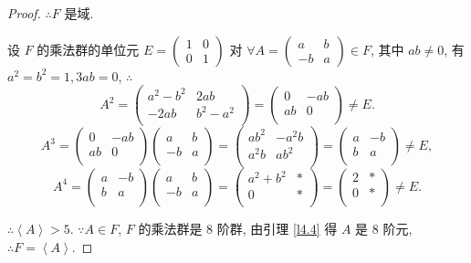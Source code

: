 \documentclass[color=black,device=normal,lang=cn,mode=geye]{elegantnote}
\begin{document}
\begin{proof}
    $\therefore F$ 是域.

    设 $F$ 的乘法群的单位元 $E=\begin{pmatrix} 1 & 0 \\ 0 & 1 \end{pmatrix}$ 对 $\forall A=\begin{pmatrix} a & b \\ -b & a \end{pmatrix}\in F$, 其中 $ab\neq0$, 有 $a^2=b^2=1,3ab=0$, $\therefore$
    \[A^2=\begin{pmatrix}
        a^2-b^2 & 2ab \\
        -2ab & b^2-a^2 \\
    \end{pmatrix}=\begin{pmatrix}
        0 & -ab \\
        ab & 0 \\
    \end{pmatrix}\neq E.\]
    \[A^3=\begin{pmatrix}
        0 & -ab \\
        ab & 0 \\
    \end{pmatrix}\begin{pmatrix}
        a & b \\
        -b & a \\
    \end{pmatrix}=\begin{pmatrix}
        ab^2 & -a^2b \\
        a^2b & ab^2 \\
    \end{pmatrix}=\begin{pmatrix}
        a & -b \\
        b & a \\
    \end{pmatrix}\neq E,\]
    \[A^4=\begin{pmatrix}
        a & -b \\
        b & a \\
    \end{pmatrix}\begin{pmatrix}
        a & b \\
        -b & a \\
    \end{pmatrix}=\begin{pmatrix}
        a^2+b^2 & * \\
        0 & * \\
    \end{pmatrix}=\begin{pmatrix}
        2 & * \\
        0 & * \\
    \end{pmatrix}\neq E.\]

    $\therefore\left<A\right>>5$.
    $\because A\in F$, $F$ 的乘法群是 $8$ 阶群, 由引理 \ref{l4.4} 得 $A$ 是 $8$ 阶元, $\therefore F=\left<A\right>$.
\end{proof}
\end{document}
